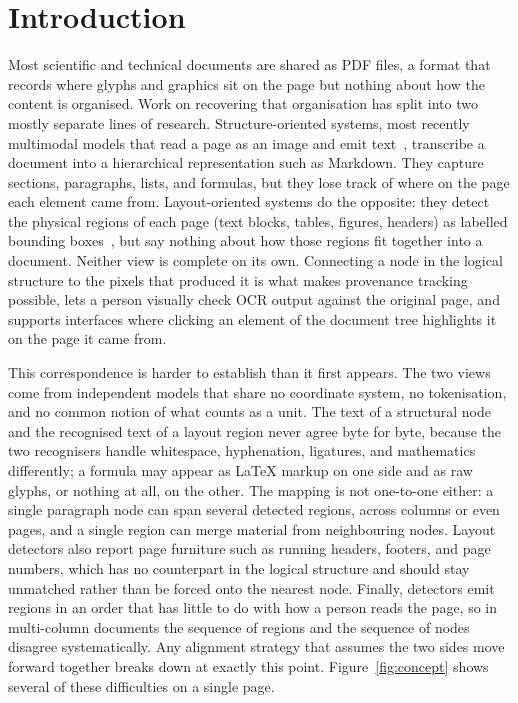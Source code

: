 \documentclass[11pt,twoside]{article}
\begin{document}
  \maketitle

\section{Introduction}

Most scientific and technical documents are shared as PDF files, a format that records where glyphs and graphics sit on the page but nothing about how the content is organised. Work on recovering that organisation has split into two mostly separate lines of research. Structure-oriented systems, most recently multimodal models that read a page as an image and emit text~\cite{nougat}, transcribe a document into a hierarchical representation such as Markdown. They capture sections, paragraphs, lists, and formulas, but they lose track of where on the page each element came from. Layout-oriented systems do the opposite: they detect the physical regions of each page (text blocks, tables, figures, headers) as labelled bounding boxes~\cite{publaynet}, but say nothing about how those regions fit together into a document. Neither view is complete on its own. Connecting a node in the logical structure to the pixels that produced it is what makes provenance tracking possible, lets a person visually check OCR output against the original page, and supports interfaces where clicking an element of the document tree highlights it on the page it came from.

This correspondence is harder to establish than it first appears. The two views come from independent models that share no coordinate system, no tokenisation, and no common notion of what counts as a unit. The text of a structural node and the recognised text of a layout region never agree byte for byte, because the two recognisers handle whitespace, hyphenation, ligatures, and mathematics differently; a formula may appear as \LaTeX{} markup on one side and as raw glyphs, or nothing at all, on the other. The mapping is not one-to-one either: a single paragraph node can span several detected regions, across columns or even pages, and a single region can merge material from neighbouring nodes. Layout detectors also report page furniture such as running headers, footers, and page numbers, which has no counterpart in the logical structure and should stay unmatched rather than be forced onto the nearest node. Finally, detectors emit regions in an order that has little to do with how a person reads the page, so in multi-column documents the sequence of regions and the sequence of nodes disagree systematically. Any alignment strategy that assumes the two sides move forward together breaks down at exactly this point. Figure~\ref{fig:concept} shows several of these difficulties on a single page.
\end{document}

